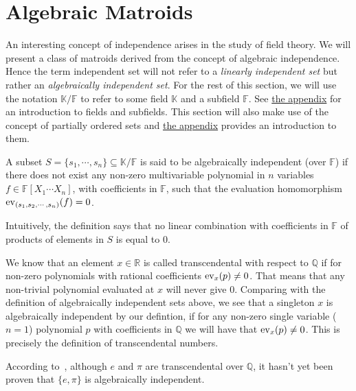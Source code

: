 \newpage

\section{Algebraic Matroids}\label{sec:algebraic-matroids}

An interesting concept of independence arises in the study of field theory.  We will present a class of matroids derived from the concept of algebraic independence. Hence the term independent set will not refer to a \textit{linearly independent set} but rather an \textit{algebraically independent set}. For the rest of this section, we will use the notation $\mathbb K / \mathbb F$ to refer to some field $\mathbb K$ and a subfield $\mathbb F$. See \hyperref[sec:appendix-fields]{the appendix} for an introduction to fields and subfields. This section will also make use of the concept of partially ordered sets and  \hyperref[sec:appendix-poset]{the appendix} provides an introduction to them.

\begin{defn}
	A subset $S = \{ s_1 ,\cdots, s _n \} \subseteq \mathbb K / \mathbb F$ is said to be algebraically independent (over $\mathbb F$) if there does not exist any
	non-zero multivariable polynomial in $n$ variables $f \in \mathbb{F}[X _1 \cdots X _n]$, with coefficients in $\mathbb{F} $, such that the evaluation homomorphism $\mathrm{ev}_{(s_1, s_2,\cdots,s_n)}(f) = 0$.
\end{defn}
Intuitively, the definition says that no linear combination with coefficients in $\mathbb F$ of products of elements in $S$ is equal to $0$.

We know that an element $x\in \mathbb{R}$ is called transcendental with respect to $\mathbb{Q}$ if for non-zero polynomials with rational coefficients $\mathrm{ev}_{x}(p) \neq 0$. That means that any non-trivial polynomial evaluated at $x$ will never give 0.
Comparing with the definition of algebraically independent sets above, we see that a singleton ${x}$ is algebraically independent by our defintion, if for any non-zero  single variable ($n = 1$) polynomial $p$ with coefficients in $\mathbb{Q}$ we will have that $\mathrm{ev}_{x}(p) \neq 0$. This is precisely the definition of transcendental numbers.

\begin{exmp}
According to~\cite[p. 113]{milne2022}, although $e$ and $\pi$ are transcendental over $\mathbb{Q}$, it hasn't yet been proven that $\{e, \pi \}$ is algebraically independent.
\end{exmp}

